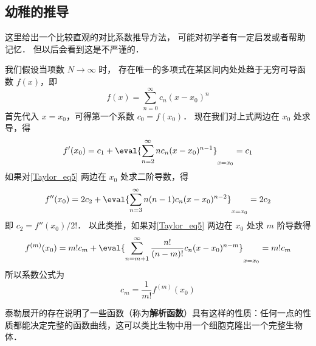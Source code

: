 \subsection{幼稚的推导}
这里给出一个比较直观的对比系数推导方法， 可能对初学者有一定启发或者帮助记忆． 但以后会看到这是不严谨的．

我们假设当项数 $N \to \infty$ 时， 存在唯一的多项式在某区间内处处趋于无穷可导函数 $f(x)$，即
\begin{equation}\label{Taylor_eq5}
f(x) = \sum_{n = 0}^\infty  c_n (x - x_0)^n
\end{equation}
首先代入 $x = x_0$，可得第一个系数 $c_0 = f(x_0)$． 现在我们对上式两边在 $x_0$ 处求导，得
\begin{equation}
f'(x_0) = c_1 + \eval{ \sum_{n = 2}^\infty n c_n (x - x_0)^{n - 1} }_{x = x_0}  = c_1
\end{equation}
如果对\autoref{Taylor_eq5} 两边在 $x_0$ 处求二阶导数，得
\begin{equation}
f''(x_0) = 2 c_2 + \eval{ \sum_{n = 3}^\infty  n(n - 1) c_n (x - x_0)^{n - 2} }_{x = x_0}  = 2 c_2
\end{equation}
即 $c_2 = f''(x_0)/2!$．  以此类推，如果对\autoref{Taylor_eq5} 两边在 $x_0$ 处求 $m$ 阶导数得
\begin{equation}
f^{(m)}(x_0) = m! c_m + \eval{ \sum_{n = m + 1}^\infty  \frac{n!}{(n - m)!} c_n (x - x_0)^{n - m} }_{x = x_0}  = m! c_m
\end{equation}
所以系数公式为
\begin{equation}
{c_m} = \frac{1}{m!} f^{(m)}(x_0)
\end{equation}

泰勒展开的存在说明了一些函数（称为\textbf{解析函数}）具有这样的性质：任何一点的性质都能决定完整的函数曲线，这可以类比生物中用一个细胞克隆出一个完整生物体．
